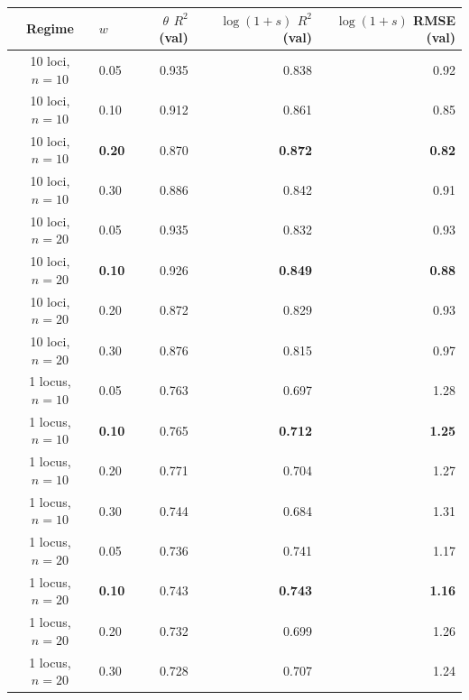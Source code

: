 \begin{tabular}{clrrr}
\toprule
Regime & $w$ & $\theta$ $R^2$ (val) & $\log(1{+}s)$ $R^2$ (val) & $\log(1{+}s)$ RMSE (val) \\
\midrule
10 loci, $n{=}10$ & 0.05 & 0.935 & 0.838 & 0.92 \\
10 loci, $n{=}10$ & 0.10 & 0.912 & 0.861 & 0.85 \\
10 loci, $n{=}10$ & \textbf{0.20} & 0.870 & \textbf{0.872} & \textbf{0.82} \\
10 loci, $n{=}10$ & 0.30 & 0.886 & 0.842 & 0.91 \\
10 loci, $n{=}20$ & 0.05 & 0.935 & 0.832 & 0.93 \\
10 loci, $n{=}20$ & \textbf{0.10} & 0.926 & \textbf{0.849} & \textbf{0.88} \\
10 loci, $n{=}20$ & 0.20 & 0.872 & 0.829 & 0.93 \\
10 loci, $n{=}20$ & 0.30 & 0.876 & 0.815 & 0.97 \\
1 locus, $n{=}10$ & 0.05 & 0.763 & 0.697 & 1.28 \\
1 locus, $n{=}10$ & \textbf{0.10} & 0.765 & \textbf{0.712} & \textbf{1.25} \\
1 locus, $n{=}10$ & 0.20 & 0.771 & 0.704 & 1.27 \\
1 locus, $n{=}10$ & 0.30 & 0.744 & 0.684 & 1.31 \\
1 locus, $n{=}20$ & 0.05 & 0.736 & 0.741 & 1.17 \\
1 locus, $n{=}20$ & \textbf{0.10} & 0.743 & \textbf{0.743} & \textbf{1.16} \\
1 locus, $n{=}20$ & 0.20 & 0.732 & 0.699 & 1.26 \\
1 locus, $n{=}20$ & 0.30 & 0.728 & 0.707 & 1.24 \\
\bottomrule
\end{tabular}
